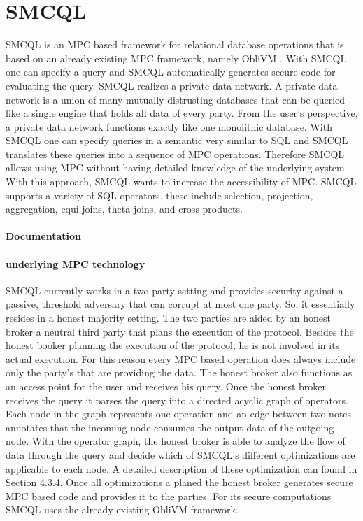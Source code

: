 \section{SMCQL}
SMCQL \cite{bater} is an MPC based framework for relational database operations that is based on an already existing MPC framework, namely ObliVM \cite{liu2015oblivm}. With SMCQL one can specify a query and SMCQL automatically generates secure code for evaluating the query. 
SMCQL realizes a private data network. A private data network is a union of many mutually distrusting databases that can be queried like a single engine that holds all data of every party. From the user's perspective, a private data network functions exactly like one monolithic database. With SMCQL one can specify queries in a semantic very similar to SQL and SMCQL translates these queries into a sequence of MPC operations. Therefore SMCQL allows using MPC without having detailed knowledge of the underlying system. With this approach, SMCQL wants to increase the accessibility of MPC. SMCQL supports a variety of SQL operators, these include selection, projection, aggregation, equi-joins, theta joins, and cross products. 


\paragraph{Documentation}




\paragraph{underlying MPC technology}
SMCQL currently works in a two-party setting and provides security against a passive, threshold adversary that can corrupt at most one party.  So, it essentially resides in a honest majority setting. The two parties are aided by an honest broker a neutral third party that plans the execution of the protocol. Besides the honest booker planning the execution of the protocol, he is not involved in its actual execution. For this reason every MPC based operation does always include only the party's that are providing the data.
The honest broker also functions as an access point for the user and receives his query. 
Once the honest broker receives the query it parses the query into a directed acyclic graph of operators. Each node in the graph represents one operation and an edge between two notes annotates that the incoming node consumes the output data of the outgoing node. With the operator graph, the honest broker is able to analyze the flow of data through the query and decide which of SMCQL's different optimizations are applicable to each node. 
A detailed description of these optimization can found in \hyperref[sec:Optimizations_smcql]{Section 4.3.4}. Once all optimizations a planed the honest broker generates secure MPC based code and provides it to the parties. For its secure computations SMCQL uses the already existing ObliVM framework.
